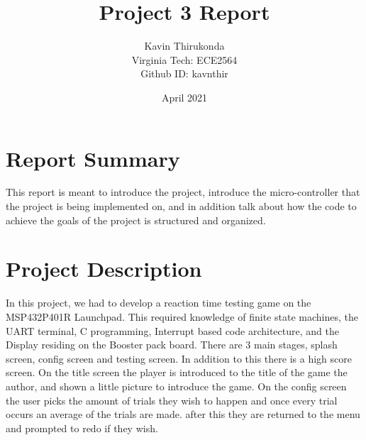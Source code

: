 \documentclass{article}
\title{Project 3 Report}
\author{Kavin Thirukonda\\
  Virginia Tech:  ECE2564\\
  Github ID: kavnthir
}
\date{April 2021}
\begin{document}
\maketitle
\newpage
\section{Report Summary}
\indent
This report is meant to introduce the project, introduce the micro-controller that the project is being implemented on, and in addition talk about how the code to achieve the goals of the project is structured and organized.
\section{Project Description}
\indent
In this project, we had to develop a reaction time testing game on the MSP432P401R Launchpad. This required knowledge of finite state machines, the UART terminal, C programming, Interrupt based code architecture, and the Display residing on the Booster pack board. There are 3 main stages, splash screen, config screen and testing screen. In addition to this there is a high score screen. On the title screen the player is introduced to the title of the game the author, and shown a little picture to introduce the game. On the config screen the user picks the amount of trials they wish to happen and once every trial occurs an average of the trials are made. after this they are returned to the menu and prompted to redo if they wish. 
\begin{center}
\end{center}
\end{document}
